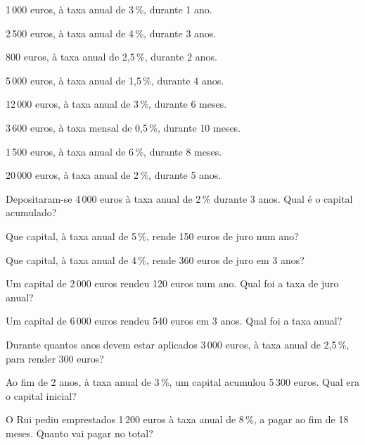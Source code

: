 \documentclass[12pt]{article}
\begin{document}


\begin{exercicios}
  \item 1\,000 euros, à taxa anual de 3\,\%, durante 1 ano.
  \item 2\,500 euros, à taxa anual de 4\,\%, durante 3 anos.
  \item 800 euros, à taxa anual de 2,5\,\%, durante 2 anos.
  \item 5\,000 euros, à taxa anual de 1,5\,\%, durante 4 anos.
  \item 12\,000 euros, à taxa anual de 3\,\%, durante 6 meses.
  \item 3\,600 euros, à taxa mensal de 0,5\,\%, durante 10 meses.
  \item 1\,500 euros, à taxa anual de 6\,\%, durante 8 meses.
  \item 20\,000 euros, à taxa anual de 2\,\%, durante 5 anos.
\end{exercicios}

\begin{exercicios}
  \item Depositaram-se 4\,000 euros à taxa anual de 2\,\% durante 3 anos. Qual é o capital acumulado?
  \item Que capital, à taxa anual de 5\,\%, rende 150 euros de juro num ano?
  \item Que capital, à taxa anual de 4\,\%, rende 360 euros de juro em 3 anos?
  \item Um capital de 2\,000 euros rendeu 120 euros num ano. Qual foi a taxa de juro anual?
  \item Um capital de 6\,000 euros rendeu 540 euros em 3 anos. Qual foi a taxa anual?
  \item Durante quantos anos devem estar aplicados 3\,000 euros, à taxa anual de 2,5\,\%, para render 300 euros?
  \item Ao fim de 2 anos, à taxa anual de 3\,\%, um capital acumulou 5\,300 euros. Qual era o capital inicial?
  \item O Rui pediu emprestados 1\,200 euros à taxa anual de 8\,\%, a pagar ao fim de 18 meses. Quanto vai pagar no total?
\end{exercicios}
\end{document}
